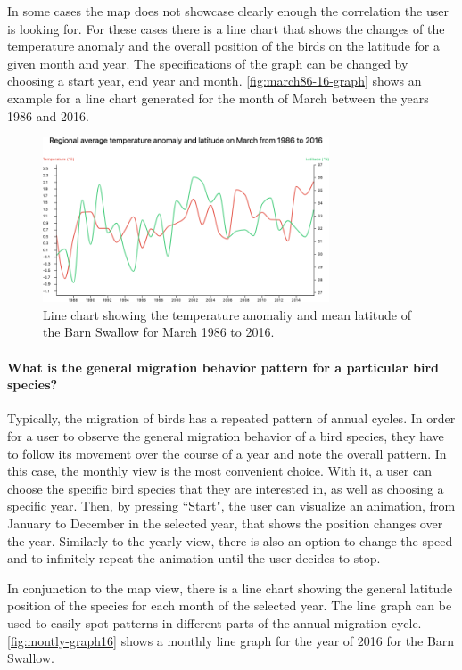 \documentclass[journal]{vgtc}                %
\begin{document}
In some cases the map does not showcase clearly enough the correlation the user is looking for. For these cases there is a line chart that shows the changes of the temperature anomaly and the overall position of the birds on the latitude for a given month and year. The specifications of the graph can be changed by choosing a start year, end year and month. \autoref{fig:march86-16-graph} shows an example for a line chart generated for the month of March between the years 1986 and 2016.

\begin{figure}[h]
  \centering
  \includegraphics[width=85mm]{march86-16-graph-barnswallow}
  \caption{Line chart showing the temperature anomaliy and mean latitude of the Barn Swallow for March 1986 to 2016.}
  \label{fig:march86-16-graph}
\end{figure}

\paragraph{What is the general migration behavior pattern for a particular bird species?}

Typically, the migration of birds has a repeated pattern of annual cycles. In order for a user to observe the general migration behavior of a bird species, they have to follow its movement over the course of a year and note the overall pattern. In this case, the monthly view is the most convenient choice. With it, a user can choose the specific bird species that they are interested in, as well as choosing a specific year. Then, by pressing ``Start", the user can visualize an animation, from January to December in the selected year, that shows the position changes over the year. Similarly to the yearly view, there is also an option to change the speed and to infinitely repeat the animation until the user decides to stop.

In conjunction to the map view, there is a line chart showing the general latitude position of the species for each month of the selected year. The line graph can be used to easily spot patterns in different parts of the annual migration cycle. \autoref{fig:montly-graph16} shows a monthly line graph for the year of 2016 for the Barn Swallow.
\end{document}
